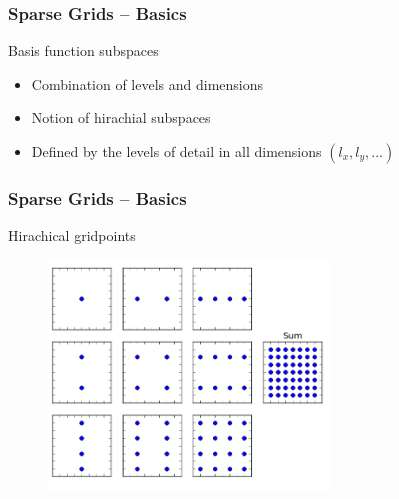 \begin{frame}
  \frametitle{Sparse Grids -- Basics}
  \topline
  \vspace{-10px}
  \begin{block}{Basis function subspaces}
    \begin{itemize}
      \item Combination of levels and dimensions
      \item Notion of hirachial subspaces
      \item Defined by the levels of detail in all dimensions $(l_x, l_y, ...)$
    \end{itemize}
  \end{block}
\end{frame}

\begin{frame}
  \frametitle{Sparse Grids -- Basics}
  \topline
  \vspace{-10px}
  \begin{block}{Hirachical gridpoints}
    \begin{figure}[!htp]
      \centering
      \includegraphics[width=7.5cm]{images/sparsegrid_hirach1}
      \vspace{-12px}
      \caption{}
    \end{figure}
  \end{block}
\end{frame}

